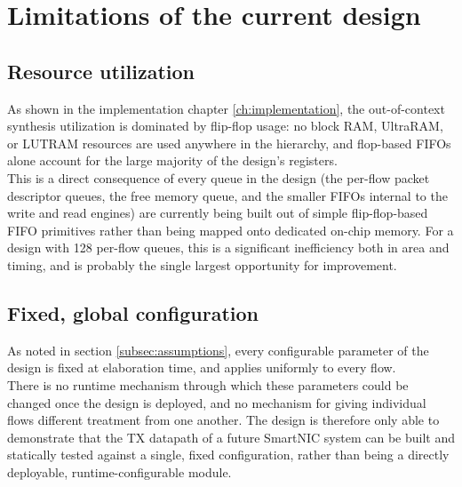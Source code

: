 \section{Limitations of the current design}

\subsection{Resource utilization}

As shown in the implementation chapter \ref{ch:implementation}, the out-of-context 
synthesis utilization is dominated by flip-flop usage: no block RAM, UltraRAM, or LUTRAM resources are used
anywhere in the hierarchy, and flop-based FIFOs alone account for the large majority of the
design's registers. \\ 

This is a direct consequence of every queue in the design (the per-flow
packet descriptor queues, the free memory queue, and the smaller FIFOs internal to the write
and read engines) are currently being built out of simple flip-flop-based FIFO primitives rather
than being mapped onto dedicated on-chip memory. For a design with 128 per-flow queues, this is
a significant inefficiency both in area and timing, and is probably the single largest opportunity for improvement.

\subsection{Fixed, global configuration}

As noted in section \ref{subsec:assumptions}, 
every configurable parameter of the design is fixed at elaboration time, and applies
uniformly to every flow. \\ 

There is no runtime mechanism through which these parameters could be
changed once the design is deployed, and no mechanism for giving individual flows different
treatment from one another. The design is therefore only able to demonstrate that the
TX datapath of a future SmartNIC system can be built and statically tested against a
single, fixed configuration, rather than being a directly deployable, runtime-configurable
module.


